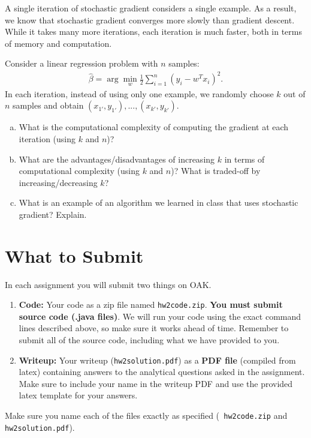 \documentclass[11pt]{article}
\begin{document}
A single iteration of stochastic gradient considers a single example. As a result, we know that stochastic gradient converges more slowly than gradient descent. While it takes many more iterations, each iteration is much faster, both in terms of memory and computation.

Consider a linear regression problem with $n$ samples:
\begin{align}
\hat{\beta} = \arg\min_{w}\frac{1}{2}\sum_{i=1}^n(y_i - w^T x_i)^2.
\end{align}
In each iteration, instead of using only one example, we randomly choose $k$ out of $n$ samples and obtain $(x_{1'},y_{1'}),...,(x_{k'},y_{k'})$. 
\begin{enumerate}[(a)]
\item What is the computational complexity of computing the gradient at each iteration (using $k$ and $n$)?
\item What are the advantages/disadvantages of increasing $k$ in terms of computational complexity (using $k$ and $n$)? What is traded-off by increasing/decreasing $k$?
\item What is an example of an algorithm we learned in class that uses stochastic gradient? Explain.
\end{enumerate}


\section{What to Submit}
In each assignment you will submit two things on OAK.
\begin{enumerate}
\item {\bf Code:} Your code as a zip file named {\tt hw2code.zip}. {\bf You must submit source code (.java files)}. We will run your code using the exact command lines described above, so make sure it works ahead of time. Remember to submit all of the source code, including what we have provided to you.
\item {\bf Writeup:} Your writeup ({\tt hw2solution.pdf}) as a {\bf PDF file} (compiled from latex) containing answers to the analytical questions asked in the assignment. Make sure to include your name in the writeup PDF and use the provided latex template for your answers.
\end{enumerate}
Make sure you name each of the files exactly as specified ({\tt
  hw2code.zip} and {\tt hw2solution.pdf}).
\end{document}
